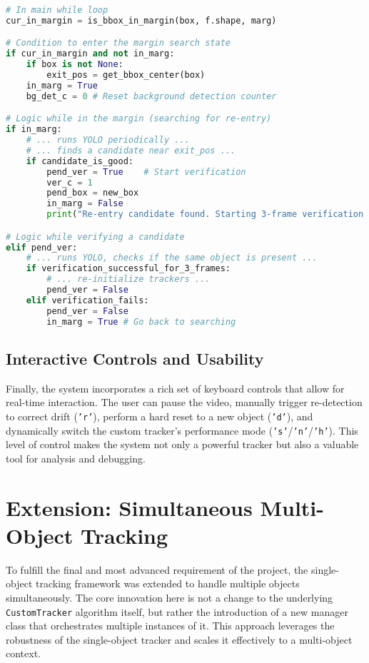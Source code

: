\documentclass[12pt, a4paper]{article}
\begin{document}
\begin{lstlisting}[language=Python, caption={Core logic for the exit and re-entry state machine.}, label={lst:reentry_logic}]
# In main while loop
cur_in_margin = is_bbox_in_margin(box, f.shape, marg)

# Condition to enter the margin search state
if cur_in_margin and not in_marg:
    if box is not None:
        exit_pos = get_bbox_center(box)
    in_marg = True
    bg_det_c = 0 # Reset background detection counter

# Logic while in the margin (searching for re-entry)
if in_marg:
    # ... runs YOLO periodically ...
    # ... finds a candidate near exit_pos ...
    if candidate_is_good:
        pend_ver = True    # Start verification
        ver_c = 1
        pend_box = new_box
        in_marg = False
        print("Re-entry candidate found. Starting 3-frame verification...")

# Logic while verifying a candidate
elif pend_ver:
    # ... runs YOLO, checks if the same object is present ...
    if verification_successful_for_3_frames:
        # ... re-initialize trackers ...
        pend_ver = False
    elif verification_fails:
        pend_ver = False
        in_marg = True # Go back to searching
\end{lstlisting}

\subsection{Interactive Controls and Usability}
Finally, the system incorporates a rich set of keyboard controls that allow for real-time interaction. The user can pause the video, manually trigger re-detection to correct drift (\texttt{'r'}), perform a hard reset to a new object (\texttt{'d'}), and dynamically switch the custom tracker's performance mode (\texttt{'s'}/\texttt{'n'}/\texttt{'h'}). This level of control makes the system not only a powerful tracker but also a valuable tool for analysis and debugging.

\section{Extension: Simultaneous Multi-Object Tracking}
To fulfill the final and most advanced requirement of the project, the single-object tracking framework was extended to handle multiple objects simultaneously. The core innovation here is not a change to the underlying \lstinline!CustomTracker! algorithm itself, but rather the introduction of a new manager class that orchestrates multiple instances of it. This approach leverages the robustness of the single-object tracker and scales it effectively to a multi-object context.
\end{document}
